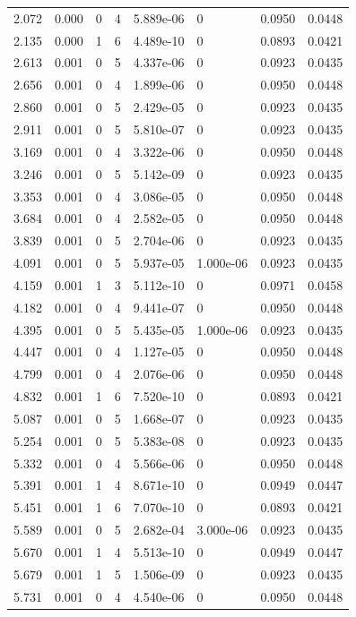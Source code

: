 \documentclass[preview]{standalone}
\begin{document}
{{\begin{tabular}{L{1.2cm}C{1.2cm} C{0.3cm}C{0.5cm} C{1.4cm}C{1.4cm} C{1.4cm}C{1.4cm}}
  2.072  &  0.000  & 0     &  4 &  5.889e-06  & 0  & 0.0950 &  0.0448   \\ 
  2.135  &  0.000  & 1     &  6 &  4.489e-10  & 0  & 0.0893 &  0.0421   \\ 
  2.613  &  0.001  & 0     &  5 &  4.337e-06  & 0  & 0.0923 &  0.0435   \\ 
  2.656  &  0.001  & 0     &  4 &  1.899e-06  & 0  & 0.0950 &  0.0448   \\ 
  2.860  &  0.001  & 0     &  5 &  2.429e-05  & 0  & 0.0923 &  0.0435   \\ 
  2.911  &  0.001  & 0     &  5 &  5.810e-07  & 0  & 0.0923 &  0.0435   \\ 
  3.169  &  0.001  & 0     &  4 &  3.322e-06  & 0  & 0.0950 &  0.0448   \\ 
  3.246  &  0.001  & 0     &  5 &  5.142e-09  & 0  & 0.0923 &  0.0435   \\ 
  3.353  &  0.001  & 0     &  4 &  3.086e-05  & 0  & 0.0950 &  0.0448   \\ 
  3.684  &  0.001  & 0     &  4 &  2.582e-05  & 0  & 0.0950 &  0.0448   \\ 
  3.839  &  0.001  & 0     &  5 &  2.704e-06  & 0  & 0.0923 &  0.0435   \\ 
  4.091  &  0.001  & 0     &  5 &  5.937e-05  & 1.000e-06  & 0.0923 &  0.0435   \\ 
  4.159  &  0.001  & 1     &  3 &  5.112e-10  & 0  & 0.0971 &  0.0458   \\ 
  4.182  &  0.001  & 0     &  4 &  9.441e-07  & 0  & 0.0950 &  0.0448   \\ 
  4.395  &  0.001  & 0     &  5 &  5.435e-05  & 1.000e-06  & 0.0923 &  0.0435   \\ 
  4.447  &  0.001  & 0     &  4 &  1.127e-05  & 0  & 0.0950 &  0.0448   \\ 
  4.799  &  0.001  & 0     &  4 &  2.076e-06  & 0  & 0.0950 &  0.0448   \\ 
  4.832  &  0.001  & 1     &  6 &  7.520e-10  & 0  & 0.0893 &  0.0421   \\ 
  5.087  &  0.001  & 0     &  5 &  1.668e-07  & 0  & 0.0923 &  0.0435   \\ 
  5.254  &  0.001  & 0     &  5 &  5.383e-08  & 0  & 0.0923 &  0.0435   \\ 
  5.332  &  0.001  & 0     &  4 &  5.566e-06  & 0  & 0.0950 &  0.0448   \\ 
  5.391  &  0.001  & 1     &  4 &  8.671e-10  & 0  & 0.0949 &  0.0447   \\ 
  5.451  &  0.001  & 1     &  6 &  7.070e-10  & 0  & 0.0893 &  0.0421   \\ 
  5.589  &  0.001  & 0     &  5 &  2.682e-04  & 3.000e-06  & 0.0923 &  0.0435   \\ 
  5.670  &  0.001  & 1     &  4 &  5.513e-10  & 0  & 0.0949 &  0.0447   \\ 
  5.679  &  0.001  & 1     &  5 &  1.506e-09  & 0  & 0.0923 &  0.0435   \\ 
  5.731  &  0.001  & 0     &  4 &  4.540e-06  & 0  & 0.0950 &  0.0448   \\ 
\hline 
\end{tabular} 

}}
\end{document}
